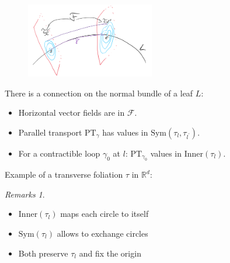 \documentclass[hyperref={pdfpagelabels=false}]{beamer}
\theoremstyle{plain}
\theoremstyle{remark}
\newtheorem*{remark}{Remarks}
\begin{document}
\begin{frame}
\begin{figure}[htbp]
	\centering
		\includegraphics[width=0.50\textwidth]{Foliation connection.png}
	\label{fig:FoliationconnectionZwei}
\end{figure}

\begin{theorem}
There is a connection on the normal bundle of a leaf $L$:
\begin{itemize}
	\item Horizontal vector fields are in $\mathcal{F}$.
	\item Parallel transport $\mathup{PT}_\gamma$ has values in $\mathup{Sym}(\tau_l, \tau_{l^\prime})$.
	\item For a contractible loop $\gamma_0$ at $l$: $\mathup{PT}_{\gamma_0}$ values in $\mathup{Inner}(\tau_l)$.
\end{itemize}
\end{theorem}

\end{frame}

{
\begin{frame}{Example of a transverse foliation $\tau$ in $\mathbb{R}^d$:}
\begin{minipage}[]{0.45\textwidth}
\begin{figure}
\end{figure}
\end{minipage}
\hfill
\begin{minipage}[]{0.45\textwidth}
\begin{remark}
\begin{itemize}
	\item $\mathup{Inner}(\tau_l)$ maps each circle to itself
	\item $\mathup{Sym}(\tau_l)$ allows to exchange circles
	\item Both preserve $\tau_l$ and fix the origin
\end{itemize}
\end{remark}
\end{minipage}
\end{frame}
}
\end{document}
